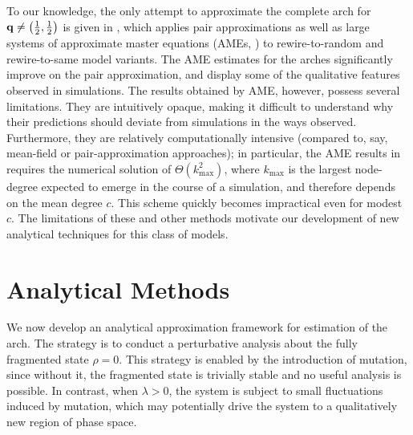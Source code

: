 \documentclass[review, onefignum, onetabnum]{siamart171218}
\begin{document}
	To our knowledge, the only attempt to approximate the complete arch for $\mathbf{q} \neq \left(\frac{1}{2}, \frac{1}{2}\right)$ is given in \cite{Durrett2012}, which applies pair approximations as well as large systems of approximate master equations (AMEs, \cite{Gleeson2013}) to rewire-to-random and rewire-to-same model variants. 
	The AME estimates for the arches significantly improve on the pair approximation, and display some of the qualitative features observed in simulations. 
	The results obtained by AME, however, possess several limitations. 
	They are intuitively opaque, making it difficult to understand why their predictions should deviate from simulations in the ways observed.  
	Furthermore, they are relatively computationally intensive (compared to, say, mean-field or pair-approximation approaches); in particular, the AME results in \cite{Durrett2012} requires the numerical solution of $\Theta(k_\mathrm{max}^2)$, where $k_\mathrm{max}$ is the largest node-degree expected to emerge in the course of a simulation, and therefore depends on the mean degree $c$. 
	This scheme quickly becomes impractical even for modest $c$. 
	The limitations of these and other methods motivate our development of new analytical techniques for this class of models. 

	\section{Analytical Methods} \label{sec:analytic}
	    We now develop an analytical approximation framework for estimation of the arch. 
	    The strategy is to conduct a perturbative analysis about the fully fragmented state $\rho = 0$.
	    This strategy is enabled by the introduction of mutation, since without it, the fragmented state is trivially stable and no useful analysis is possible. 
	    In contrast, when $\lambda > 0$, the system is subject to small fluctuations induced by mutation, which may potentially drive the system to a qualitatively new region of phase space. 
	    
\end{document}
